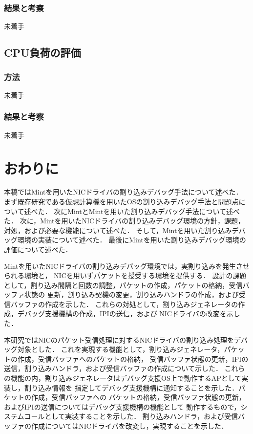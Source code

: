 \documentclass[tanilab-enum]{graduate}
\begin{document}
    \subsection{結果と考察}
    未着手
\section{CPU負荷の評価}
    \subsection{方法}
    未着手
    \subsection{結果と考察}
    未着手
\chapter{おわりに}\label{conclusion}

本稿ではMintを用いたNICドライバの割り込みデバッグ手法について述べた．
まず既存研究である仮想計算機を用いたOSの割り込みデバッグ手法と問題点について述べた．
次にMintとMintを用いた割り込みデバッグ手法について述べた．
次に，Mintを用いたNICドライバの割り込みデバッグ環境の方針，課題，
対処，および必要な機能について述べた．
そして，Mintを用いた割り込みデバッグ環境の実装について述べた．
最後にMintを用いた割り込みデバッグ環境の評価について述べた．

Mintを用いたNICドライバの割り込みデバッグ環境では，実割り込みを発生させられる環境と，
NICを用いずパケットを授受する環境を提供する．
設計の課題として，割り込み間隔と回数の調整，パケットの作成，パケットの格納，受信バッファ状態の
更新，割り込み契機の変更，割り込みハンドラの作成，および受信バッファの作成を示した．
これらの対処として，割り込みジェネレータの作成，デバッグ支援機構の作成，IPIの送信，および
NICドライバの改変を示した．

本研究ではNICのパケット受信処理に対するNICドライバの割り込み処理をデバッグ対象とした．
これを実現する機能として，割り込みジェネレータ，パケットの作成，受信バッファへのパケットの格納，
受信バッファ状態の更新，IPIの送信，割り込みハンドラ，および受信バッファの作成について示した．
これらの機能の内，割り込みジェネレータはデバッグ支援OS上で動作するAPとして実装し，割り込み情報を
指定してデバッグ支援機構に通知することを示した．パケットの作成，受信バッファへの
パケットの格納，受信バッファ状態の更新，およびIPIの送信についてはデバッグ支援機構の機能として
動作するもので，システムコールとして実装することを示した．
割り込みハンドラ，および受信バッファの作成についてはNICドライバを改変し，実現することを示した．
\end{document}
